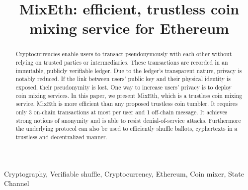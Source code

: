 \documentclass[conference, compsoc]{IEEEtran}
\theoremstyle{definition}
\begin{document}
\title{MixEth: efficient, trustless coin mixing service for Ethereum}

\author{
\and
{}
}

\maketitle

\begin{abstract}
Cryptocurrencies enable users to transact pseudonymously with each other without relying on trusted parties or intermediaries. These transactions are recorded in an immutable, publicly verifiable ledger. Due to the ledger's transparent nature, privacy is notably reduced. If the link between users' public key and their physical identity is exposed, their pseudonymity is lost. One way to increase users' privacy is to deploy coin mixing services. In this paper, we present MixEth, which is a trustless coin mixing service. MixEth is more efficient than any proposed trustless coin tumbler. It requires only 3 on-chain transactions at most per user and 1 off-chain message. It achieves strong notions of anonymity and is able to resist denial-of-service attacks. Furthermore the underlying protocol can also be used to efficiently shuffle ballots, cyphertexts in a trustless and decentralized manner.
\end{abstract}

\begin{IEEEkeywords}
Cryptography, Verifiable shuffle, Cryptocurrency, Ethereum, Coin mixer, State Channel
\end{IEEEkeywords}
\end{document}
